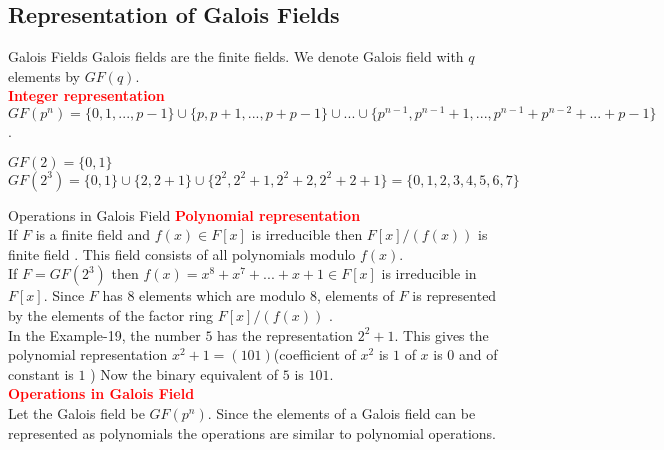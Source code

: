 \documentclass{beamer}
\begin{document}
\subsection{Representation of Galois Fields}
\begin{frame}{Galois Fields}
  Galois fields are the finite fields. We denote Galois field with \(q\) elements by \(GF(q)\).\\[4mm]

\textcolor{red}{\textbf{Integer representation}}\\[2mm]
\(GF(p^n)=\{0,1,...,p-1\} \cup \{p,p+1,...,p+p-1\} \cup ... \cup \{p^{n-1},p^{n-1}+1,...,p^{n-1}+p^{n-2}+...+p-1\}\) \cite{galois}.
\vspace{5mm}

\begin{example}[Example]
    \(GF(2)=\{0,1\}\)\\
    \(GF(2^3)=\{0,1\} \cup \{2,2+1\} \cup \{2^2,2^2+1,2^2+2,2^2+2+1\}=\{0,1,2,3,4,5,6,7\}\)
\end{example}
\end{frame}

\begin{frame}{Operations in Galois Field}
\textcolor{red}{\textbf{Polynomial representation}}\\[2mm]
If \(F\) is a finite field and \(f(x) \in F[x]\) is irreducible then \textcolor{green!50!black}{\(F[x]/(f(x))\) is finite field \cite{galois}.} This field consists of all polynomials modulo \(f(x)\). \\
If \(F=GF(2^3)\) then \textcolor{green!50!black}{\(f(x)=x^8+x^7+...+x+1 \in F[x]\)} is irreducible in \(F[x]\). Since \(F\) has \(8\) elements which are modulo \(8\), elements of \(F\) is represented by the elements of the factor ring \(F[x]/(f(x))\) \cite{aes}. \\[5mm]


In the Example-19, the number \(5\) has the representation \(2^2+1\). This gives the polynomial representation \(x^2+1=(101)\)(coefficient of \(x^2\) is \(1\) of \(x\) is \(0\) and of constant is \(1\) ) Now the binary equivalent of \(5\) is \(101\).\\[5mm]

\textcolor{red}{\textbf{Operations in Galois Field}}\\[2mm]
Let the Galois field be \(GF(p^n)\). Since the elements of a Galois field can be represented as polynomials the operations are similar to polynomial operations.
\end{frame}
\end{document}
